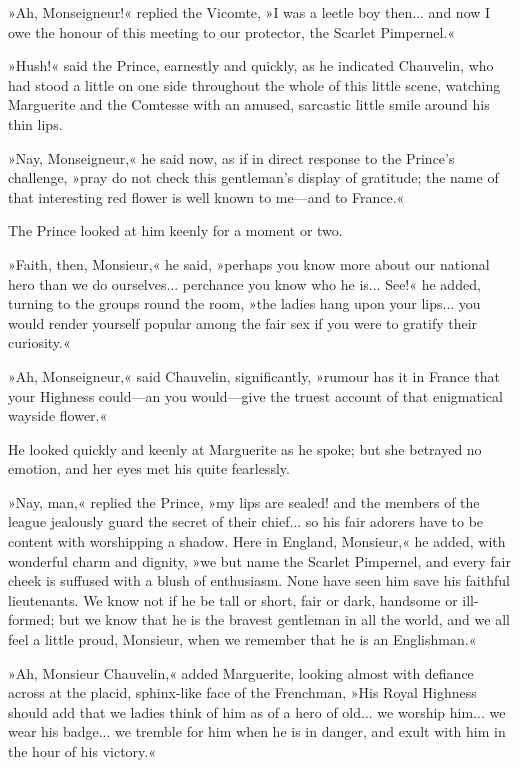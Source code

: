 »Ah, Monseigneur!« replied the Vicomte, »I was a leetle boy then... and now I owe the honour of this meeting to our protector, the Scarlet Pimpernel.«

»Hush!« said the Prince, earnestly and quickly, as he indicated Chauvelin, who had stood a little on one side throughout the whole of this little scene, watching Marguerite and the Comtesse with an amused, sarcastic little smile around his thin lips.

»Nay, Monseigneur,« he said now, as if in direct response to the Prince's challenge, »pray do not check this gentleman's display of gratitude; the name of that interesting red flower is well known to me\allowbreak---\allowbreak and to France.«

The Prince looked at him keenly for a moment or two.

»Faith, then, Monsieur,« he said, »perhaps you know more about our national hero than we do ourselves... perchance you know who he is... See!« he added, turning to the groups round the room, »the ladies hang upon your lips... you would render yourself popular among the fair sex if you were to gratify their curiosity.«

»Ah, Monseigneur,« said Chauvelin, significantly, »rumour has it in France that your Highness could\allowbreak---\allowbreak an you would\allowbreak---\allowbreak give the truest account of that enigmatical wayside flower.«

He looked quickly and keenly at Marguerite as he spoke; but she betrayed no emotion, and her eyes met his quite fearlessly.

»Nay, man,« replied the Prince, »my lips are sealed! and the members of the league jealously guard the secret of their chief... so his fair adorers have to be content with worshipping a shadow. Here in England, Monsieur,« he added, with wonderful charm and dignity, »we but name the Scarlet Pimpernel, and every fair cheek is suffused with a blush of enthusiasm. None have seen him save his faithful lieutenants. We know not if he be tall or short, fair or dark, handsome or ill-formed; but we know that he is the bravest gentleman in all the world, and we all feel a little proud, Monsieur, when we remember that he is an Englishman.«

»Ah, Monsieur Chauvelin,« added Marguerite, looking almost with defiance across at the placid, sphinx-like face of the Frenchman, »His Royal Highness should add that we ladies think of him as of a hero of old... we worship him... we wear his badge... we tremble for him when he is in danger, and exult with him in the hour of his victory.«


